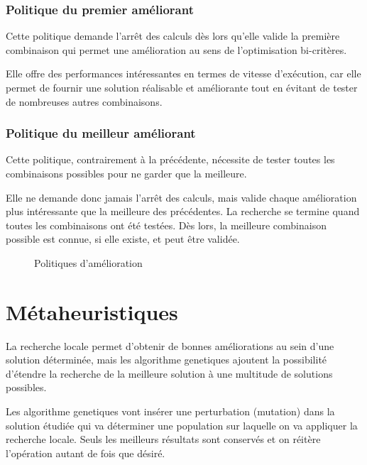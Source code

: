 			\subsubsection{Politique du premier améliorant}
				\label{subs:first_available_policy}
				Cette politique demande l'arrêt des calculs dès lors qu'elle valide la première combinaison qui permet une amélioration au sens de l'optimisation bi-critères. 

				Elle offre des performances intéressantes en termes de vitesse d'exécution, car elle permet de fournir une solution réalisable et améliorante tout en évitant de tester de nombreuses autres combinaisons.

			\subsubsection{Politique du meilleur améliorant}
				\label{subs:best_available_policy}
				Cette politique, contrairement à la précédente, nécessite de tester toutes les combinaisons possibles pour ne garder que la meilleure. 

				Elle ne demande donc jamais l'arrêt des calculs, mais valide chaque amélioration plus intéressante que la meilleure des précédentes. La recherche se termine quand toutes les combinaisons ont été testées. Dès lors, la meilleure combinaison possible est connue, si elle existe, et peut être validée.

				\begin{figure}[h!]
					\centering
					\begin{tikzpicture}
						
					\end{tikzpicture}
					\caption[UML -- Politiques d'amélioration]{Politiques d'amélioration}
					\label{uml:available-policies}
				\end{figure}


	\section{Métaheuristiques}

		La recherche locale permet d'obtenir de bonnes améliorations au sein d'une solution déterminée, mais les \glspl{algorithme genetique} ajoutent la possibilité d'étendre la recherche de la meilleure solution à une multitude de solutions possibles.

		Les \glspl{algorithme genetique} vont insérer une perturbation (mutation) dans la solution étudiée qui va déterminer une population sur laquelle on va appliquer la recherche locale. Seuls les meilleurs résultats sont conservés et on réitère l'opération autant de fois que désiré.

